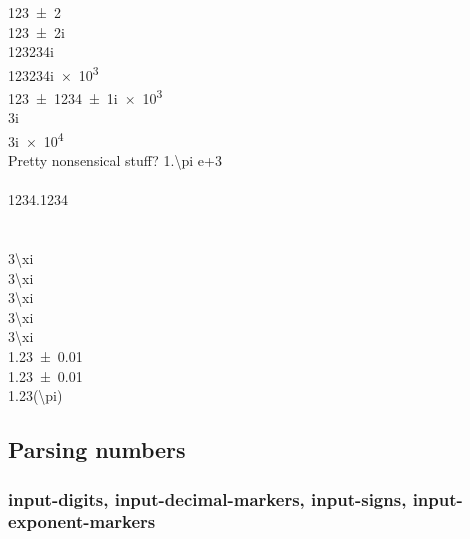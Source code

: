 \documentclass{article}
\begin{document}
\num{123\pm2}\\
\num{123\pm2i}\\
\num{123+234i}\\
\num{123+234ie3}\\
\num{123(1)+234(1)ie3}\\
\num{+3i}\\
\num{+3ie4}\\

Pretty nonsensical stuff?
\num{1.\pi e+3}\\
\def\dig{1234}\\
\num{\dig.\dig}\\
\def\odd{\xi}\\
\def\odder{\odd}\\
\num[input-symbols=\xi]{3\xi}\\
\num[input-symbols=\xi]{3\odd}\\
\num[input-symbols=\odd, input-protect-tokens=\odd]{3\odd}\\
\num[input-symbols=\odd, input-protect-tokens=\odd]{3\odder}\\
\num[input-symbols=\odder, input-protect-tokens=\odder]{3\odder}\\

\num{1.23(1)}\\
\num{1.23\pm0.01}\\
\num{1.23(\pi)}\\

\subsection{Parsing numbers}

\subsubsection{input-digits, input-decimal-markers, input-signs, input-exponent-markers}
\end{document}
